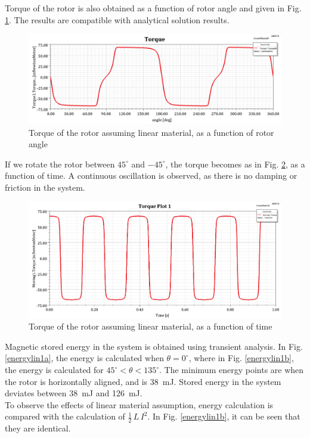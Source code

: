 \documentclass{reportClass}
\begin{document}
Torque of the rotor is also obtained as a function of rotor angle and given in Fig. \ref{fig:torque_angle}. The results are compatible with analytical solution results.

\begin{figure}[h!]
\centering
\includegraphics[width=0.75\linewidth]{torque_lin_wrtangle.png}
\caption{Torque of the rotor assuming linear material, as a function of rotor angle}
\label{fig:torque_angle}
\end{figure}

If we rotate the rotor between $45^\circ$ and $-45^\circ$, the torque becomes as in Fig. \ref{fig:torque_time}, as a function of time. A continuous oscillation is observed, as there is no damping or friction in the system.


\begin{figure}[h!]
\centering
\includegraphics[width=0.75\linewidth]{linear_torque.png}
\caption{Torque of the rotor assuming linear material, as a function of time}
\label{fig:torque_time}
\end{figure}

Magnetic stored energy in the system is obtained using transient analysis. In Fig. \ref{energylin1a}, the energy is calculated when $\theta = 0^\circ$, where in Fig. \ref{energylin1b}, the energy is calculated for $45^\circ < \theta < 135^\circ$. The minimum energy points are when the rotor is horizontally aligned, and is 38~mJ. Stored energy in the system deviates between 38~mJ and 126~mJ.\\

To observe the effects of linear material assumption, energy calculation is compared with the calculation of $\frac{1}{2}\,L\,I^2$. In Fig. \ref{energylin1b}, it can be seen that they are identical.\\
\end{document}
